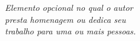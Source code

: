 \clearpage
\vspace*{0.75\textheight}
\begin{flushright}
	\textit{Elemento opcional no qual o autor \\ presta homenagem ou dedica seu \\trabalho para uma ou mais pessoas.}
\end{flushright}